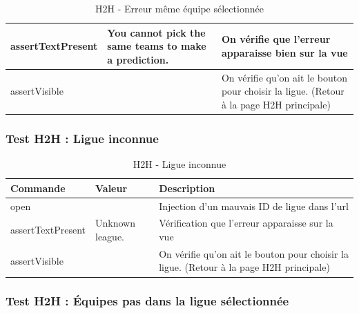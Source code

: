 \documentclass[a4paper,14pt]{extarticle}
\begin{document}
{\begin{table}[htp]
\begin{tabular}{|m{4cm}|m{4cm}|m{6cm}|}
    assertTextPresent & You cannot pick the same teams to make a prediction. & On vérifie que l'erreur apparaisse bien sur la vue                                      \\ \hline
    assertVisible     &                                                      & On vérifie qu'on ait le bouton pour choisir la ligue. (Retour à la page H2H principale) \\ \hline
    \end{tabular}
    \label{tab:H2HMemeEquipes}
    \caption{H2H - Erreur même équipe sélectionnée}
\end{table}

\newpage

\subsubsection{Test H2H : Ligue inconnue}

\begin{table}[htp]
    \centering
    \begin{tabular}{|m{4cm}|m{4cm}|m{6cm}|}
    \hline
    \textbf{Commande} & \textbf{Valeur} & \textbf{Description}                                                                                                                              \\ \hline
    open              &                 & Injection d'un mauvais ID de ligue dans l'url \\ \hline
    assertTextPresent & Unknown league. & Vérification que l'erreur apparaisse sur la vue                                                                                                   \\ \hline
    assertVisible     &                 & On vérifie qu'on ait le bouton pour choisir la ligue. (Retour à la page H2H principale)                                                           \\ \hline
    \end{tabular}
    \label{tab:H2HLigueInconnue}
    \caption{H2H - Ligue inconnue}
\end{table}

\subsubsection{Test H2H : Équipes pas dans la ligue sélectionnée}

}
\end{document}
